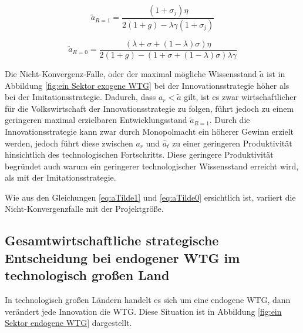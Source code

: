 	\begin{equation}
		\tilde{a}_{R=1}=\frac{(1+\sigma_j)\eta}{2(1+g)-\lambda\gamma(1+\sigma_j)}\label{eq:aTilde1}
	\end{equation}


	\begin{equation}
		\tilde{a}_{R=0} = \frac{(\lambda+\sigma+(1-\lambda)\sigma)\eta}{2(1+g)-(1+\sigma+(1-\lambda)\sigma)\lambda\gamma}\label{eq:aTilde0}
	\end{equation}


Die Nicht-Konvergenz-Falle, oder der maximal mögliche Wissensstand $\tilde{a}$ ist in Abbildung \ref{fig:ein Sektor exogene WTG} bei der Innovationsstrategie höher als bei der Imitationsstrategie. Dadurch, dass $a_r<\tilde{a}$ gilt, ist es zwar wirtschaftlicher für die Volkswirtschaft der Innovationsstrategie zu folgen, führt jedoch zu einem geringeren maximal erzielbaren Entwicklungsstand $\tilde{a}_{R=1}$. Durch die Innovationsstrategie kann zwar durch Monopolmacht ein höherer Gewinn erzielt werden, jedoch führt diese zwischen $a_r$ und $\hat{a}_t$ zu einer geringeren Produktivität hinsichtlich des technologischen Fortschritts. Diese geringere Produktivität begründet auch warum ein geringerer technologischer Wissensstand erreicht wird, als mit der Imitationsstrategie. 

Wie aus den Gleichungen \ref{eq:aTilde1} und \ref{eq:aTilde0} ersichtlich ist, variiert die Nicht-Konvergenzfalle mit der Projektgrö{\ss}e.
\newpage
\subsection{Gesamtwirtschaftliche strategische Entscheidung bei endogener WTG im technologisch gro{\ss}en Land}
In technologisch gro{\ss}en Ländern handelt es sich um eine endogene WTG, dann verändert jede Innovation die WTG. Diese Situation ist in Abbildung \ref{fig:ein Sektor endogene WTG} dargestellt.


